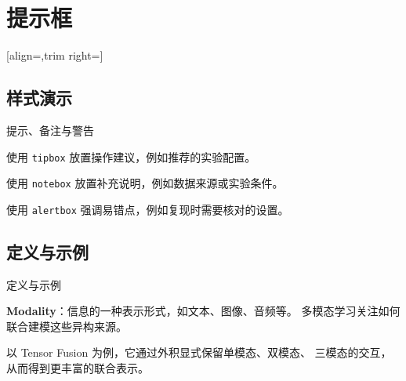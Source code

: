 \section{提示框}
[align=\campusexamplesectionalign,trim right=\campusexamplesectiontrim]
\subsection{样式演示}

\begin{frame}{提示、备注与警告}
      \begin{tipbox}[提示]
            使用 \texttt{tipbox} 放置操作建议，例如推荐的实验配置。
      \end{tipbox}

      \begin{notebox}[备注]
            使用 \texttt{notebox} 放置补充说明，例如数据来源或实验条件。
      \end{notebox}

      \begin{alertbox}[警告]
            使用 \texttt{alertbox} 强调易错点，例如复现时需要核对的设置。
      \end{alertbox}
\end{frame}



\subsection{定义与示例}

\begin{frame}{定义与示例}
      \begin{definitionbox}[定义]
            \textbf{Modality}：信息的一种表示形式，如文本、图像、音频等。
            多模态学习关注如何联合建模这些异构来源。
      \end{definitionbox}

      \begin{examplebox}[示例]
            以 Tensor Fusion 为例，它通过外积显式保留单模态、双模态、
            三模态的交互，从而得到更丰富的联合表示。
      \end{examplebox}

\end{frame}

